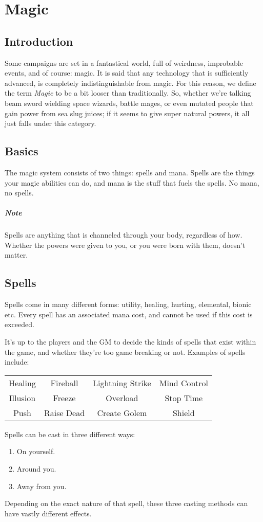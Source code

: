 \chapter{Magic} \label{chap:magic}
\section{Introduction}
Some campaigns are set in a fantastical world, full of weirdness, improbable events, and of course: magic.
It is said that any technology that is sufficiently advanced, is completely indistinguishable from magic.
For this reason, we define the term \textit{Magic} to be a bit looser than traditionally.
So, whether we're talking beam sword wielding space wizards, battle mages, or even mutated people that gain power from sea slug juices;
if it seems to give super natural powers, it all just falls under this category.

\section{Basics}
The magic system consists of two things: spells and mana.
Spells are the things your magic abilities can do, and mana is the stuff that fuels the spells.
No mana, no spells.

\paragraph{Note} Spells are anything that is channeled through your body, regardless of how.
Whether the powers were given to you, or you were born with them, doesn't matter.

\section{Spells}
Spells come in many different forms: utility, healing, hurting, elemental, bionic etc.
Every spell has an associated mana cost, and cannot be used if this cost is exceeded.

It's up to the players and the GM to decide the kinds of spells that exist within the game, and whether they're too game breaking or not.
Examples of spells include:
\begin{center}
  \begin{tabular}{c|c|c|c}
    Healing & Fireball & Lightning Strike & Mind Control \\
    Illusion & Freeze & Overload & Stop Time \\
    Push & Raise Dead & Create Golem & Shield
  \end{tabular}
\end{center}
Spells can be cast in three different ways:
\begin{enumerate}
\item On yourself.
\item Around you.
\item Away from you.
\end{enumerate}
Depending on the exact nature of that spell, these three casting methods can have vastly different effects.

